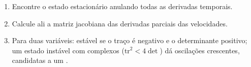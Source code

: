 \begin{method}\label{met:b3:complex-kinetics:stability}
\begin{enumerate}
  \item Encontre o estado estacionário anulando todas as derivadas temporais.
  \item Calcule ali a matriz jacobiana das derivadas parciais das velocidades.
  \item Para duas variáveis: estável se o traço é negativo e o determinante
        positivo; um estado instável com  complexos
        ($\mathrm{tr}^2 < 4\det$) dá oscilações crescentes, candidatas a um .
\end{enumerate}
\end{method}

